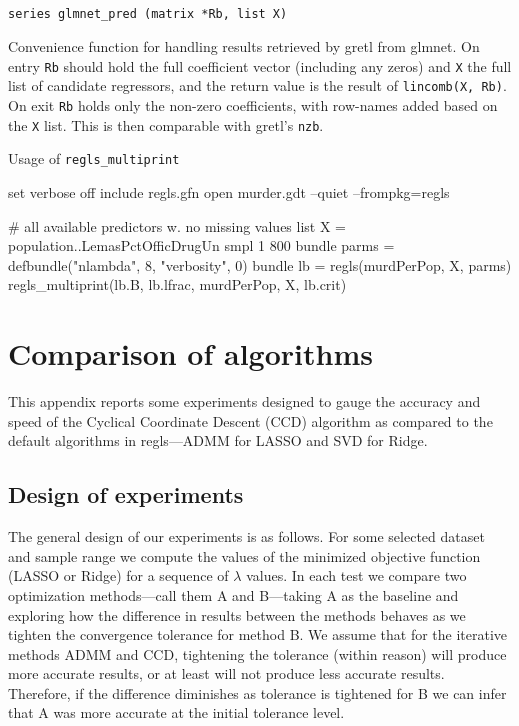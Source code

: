 \documentclass{article}
\newcommand{\startappendices}{%
\newcounter{appcount}
\setcounter{appcount}{0}
\renewcommand{\thesection}{\Alph{appcount}}}
\newcommand{\myappendix}[1]{%
\addtocounter{appcount}{1}
\section{#1}}
\newenvironment{funcdoc}
{\noindent\hrulefill\\[-12pt]}
{\medbreak}
\begin{document}
\begin{funcdoc}
\begin{verbatim}
series glmnet_pred (matrix *Rb, list X)
\end{verbatim}
  Convenience function for handling results retrieved by gretl from
  \textsf{glmnet}. On entry \texttt{Rb} should hold the full
  coefficient vector (including any zeros) and \texttt{X} the full
  list of candidate regressors, and the return value is the result of
  \texttt{lincomb(X, Rb)}. On exit \texttt{Rb} holds only the non-zero
  coefficients, with row-names added based on the \texttt{X}
  list. This is then comparable with gretl's \texttt{nzb}.
\end{funcdoc}

\begin{script}
  \caption{Usage of \texttt{regls\_multiprint}}
  \label{script:multiprint}
\begin{scode}
set verbose off
include regls.gfn
open murder.gdt --quiet --frompkg=regls

# all available predictors w. no missing values
list X = population..LemasPctOfficDrugUn
smpl 1 800
bundle parms = defbundle("nlambda", 8, "verbosity", 0)
bundle lb = regls(murdPerPop, X, parms)
regls_multiprint(lb.B, lb.lfrac, murdPerPop, X, lb.crit)
\end{scode}
  \end{script}




\clearpage
\startappendices

\myappendix{Comparison of algorithms}
\label{app:ccd}

This appendix reports some experiments designed to gauge the accuracy
and speed of the Cyclical Coordinate Descent (CCD) algorithm as
compared to the default algorithms in \textsf{regls}---ADMM for LASSO
and SVD for Ridge.

\subsection*{Design of experiments}

The general design of our experiments is as follows. For some selected
dataset and sample range we compute the values of the minimized
objective function (LASSO or Ridge) for a sequence of $\lambda$
values. In each test we compare two optimization methods---call them A
and B---taking A as the baseline and exploring how the difference in
results between the methods behaves as we tighten the convergence
tolerance for method B. We assume that for the iterative methods ADMM
and CCD, tightening the tolerance (within reason) will produce more
accurate results, or at least will not produce less accurate
results. Therefore, if the difference diminishes as tolerance is
tightened for B we can infer that A was more accurate at the initial
tolerance level.
\end{document}
